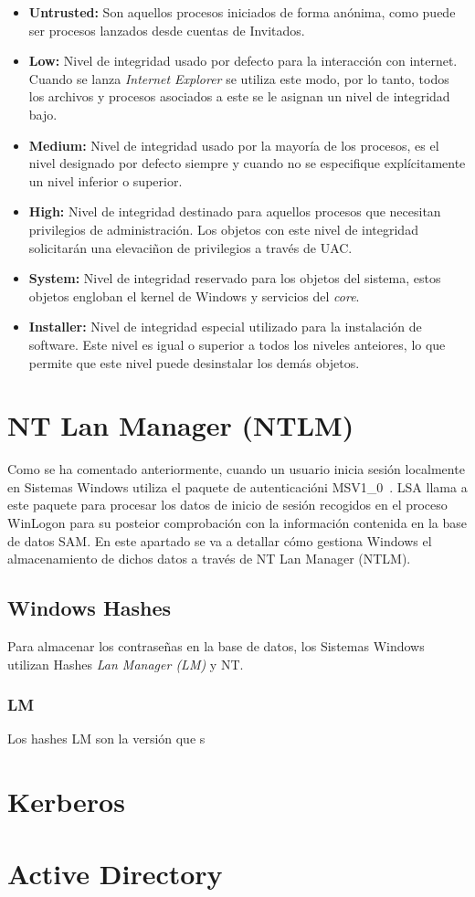 \begin{itemize}
\item \textbf{Untrusted:} Son aquellos procesos iniciados de forma anónima, como puede ser procesos lanzados desde cuentas de Invitados.  
\item \textbf{Low:} Nivel de integridad usado por defecto para la interacción con internet. Cuando se lanza {\it Internet Explorer} se utiliza este modo, por lo tanto, todos los archivos y procesos asociados a este se le asignan un nivel de integridad bajo.
\item \textbf{Medium:} Nivel de integridad usado por la mayoría de los procesos, es el nivel designado por defecto siempre y cuando no se especifique explícitamente un nivel inferior o superior.
\item \textbf{High:} Nivel de integridad destinado para aquellos procesos que necesitan privilegios de administración. Los objetos con este nivel de integridad solicitarán una elevaciñon de privilegios a través de UAC.
\item \textbf{System:} Nivel de integridad reservado para los objetos del sistema, estos objetos engloban el kernel de Windows y servicios del {\it core}.
\item \textbf{Installer:} Nivel de integridad especial utilizado para la instalación de software. Este nivel es igual o superior a todos los niveles anteiores, lo que permite que este nivel puede desinstalar los demás objetos. 
\end{itemize}

\section{NT Lan Manager (NTLM)}

Como se ha comentado anteriormente, cuando un usuario inicia sesión localmente en Sistemas Windows utiliza el paquete de autenticacióni MSV1\_0~\cite{Capitulo2:MSV10}. LSA llama a este paquete para procesar los datos de inicio de sesión recogidos en el proceso WinLogon para su posteior comprobación con la información contenida en la base de datos SAM. En este apartado se va a detallar cómo gestiona Windows el almacenamiento de dichos datos a través de NT Lan Manager (NTLM). \\

\subsection{Windows Hashes}

Para almacenar los contraseñas en la base de datos, los Sistemas Windows utilizan Hashes {\it Lan Manager (LM)} y NT.

\subsubsection{LM}

Los hashes LM son la versión que s


\section{Kerberos}

\section{Active Directory}


